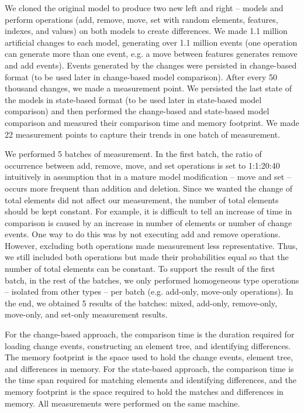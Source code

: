 \documentclass{jot}
\begin{document}
We cloned the original model to produce two new left and right -- models and perform operations (\textsf{add}, \textsf{remove}, \textsf{move}, \textsf{set} with random elements, features, indexes, and values) on both models to create differences. We made 1.1 million artificial changes to each model, generating over 1.1 million events (one operation can generate more than one event, e.g. a \textsf{move} between features generates \textsf{remove} and \textsf{add} events). Events generated by the changes were persisted in change-based format (to be used later in change-based model comparison). After every 50 thousand changes, we made a measurement point. We persisted the last state of the models in state-based format (to be used later in state-based model comparison) and then performed the change-based and state-based model comparison and measured their comparison time and memory footprint. We made 22 measurement points to capture their trends in one batch of measurement. 

We performed 5 batches of measurement. In the first batch, the ratio of occurrence between \textsf{add}, \textsf{remove}, \textsf{move}, and \textsf{set} operations is set to 1:1:20:40 intuitively in assumption that in a mature model modification -- \textsf{move} and \textsf{set} -- occurs more frequent than addition and deletion. Since we wanted the change of total elements did not affect our measurement, the number of total elements should be kept constant. For example, it is difficult to tell an increase of time in comparison is caused by an increase in number of elements or number of change events. One way to do this was by not executing \textsf{add} and \textsf{remove} operations. However, excluding both operations made measurement less representative. Thus, we still included both operations but made their probabilities equal so that the number of total elements can be constant. To support the result of the first batch, in the rest of the batches, we only performed homogeneous type operations -- isolated from other types -- per batch (e.g. add-only, move-only operations). In the end, we obtained 5 results of the batches: mixed, add-only, remove-only, move-only, and set-only measurement results.

For the change-based approach, the comparison time is the duration required for loading change events, constructing an element tree, and identifying differences. The memory footprint is the space used to hold the change events, element tree, and differences in memory. For the state-based approach, the comparison time is the time span required for matching elements and identifying differences, and the memory footprint is the space required to hold the matches and differences in memory. All measurements were performed on the same machine.
\end{document}
